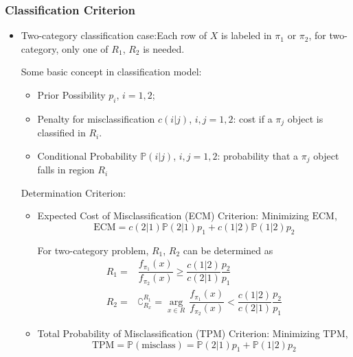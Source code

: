 \subsubsection{Classification Criterion}
\begin{itemize}[topsep=2pt,itemsep=2pt]
    \item Two-category classification case:Each row of $ X $ is labeled in $ \pi_1 $ or $ \pi_2 $, for two-category, only one of $ R_1 $, $ R_2 $ is needed.

    Some basic concept in classification model:
    \begin{itemize}[topsep=2pt,itemsep=2pt]
        \item Prior Possibility $ p_i $, $ i=1,2 $;
        \item Penalty for misclassification $ c(i|j) $, $ i,j=1,2 $: cost if a $ \pi_j $ object is classified in $ R_i $.
        \item Conditional Probability $ \mathbb{P}(i|j) $, $ i,j=1,2 $: probability that a $ \pi_j $ object falls in region $ R_i $
    \end{itemize}

    \begin{point}
Determination Criterion:
    \end{point}
\begin{itemize}[topsep=2pt,itemsep=2pt]
    \item Expected Cost of Misclassification (ECM) Criterion: Minimizing $ \mathrm{ECM} $,
    \begin{equation}
        \mathrm{ECM}=c(2|1)\mathbb{P}(2|1)p_1+c(1|2)\mathbb{P}(1|2)p_2 
    \end{equation}
    
    For two-category problem, $ R_1 $, $ R_2 $ can be determined as
    \begin{align*}
        R_1=&\dfrac{f_{\pi_1}(x)}{f_{\pi_2}(x)}\geq \dfrac{c(1|2)}{c(2|1)}\dfrac{p_2}{p_1}\\
        R_2=&\complement_{R_x}^{R_1}=\mathop{\arg}\limits_{x\in R} \,  \dfrac{f_{\pi_1}(x)}{f_{\pi_2}(x)}<\dfrac{c(1|2)}{c(2|1)}\dfrac{p_2}{p_1}
    \end{align*}
    \item Total Probability of Misclassification (TPM) Criterion: Minimizing $\mathrm{TPM}$,
    \begin{equation}
        \mathrm{TPM}=\mathbb{P}(\mathrm{misclass})=\mathbb{P}(2|1)p_1+\mathbb{P}(1|2)p_2 
    \end{equation}


\end{itemize}
\end{itemize}
